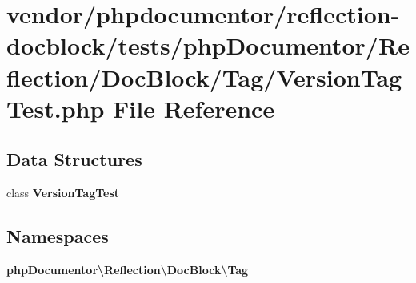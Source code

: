 \section{vendor/phpdocumentor/reflection-\/docblock/tests/php\+Documentor/\+Reflection/\+Doc\+Block/\+Tag/\+Version\+Tag\+Test.php File Reference}
\label{_version_tag_test_8php}
\subsection*{Data Structures}
\begin{DoxyCompactItemize}
\item 
class {\bf Version\+Tag\+Test}
\end{DoxyCompactItemize}
\subsection*{Namespaces}
\begin{DoxyCompactItemize}
\item 
 {\bf php\+Documentor\textbackslash{}\+Reflection\textbackslash{}\+Doc\+Block\textbackslash{}\+Tag}
\end{DoxyCompactItemize}
